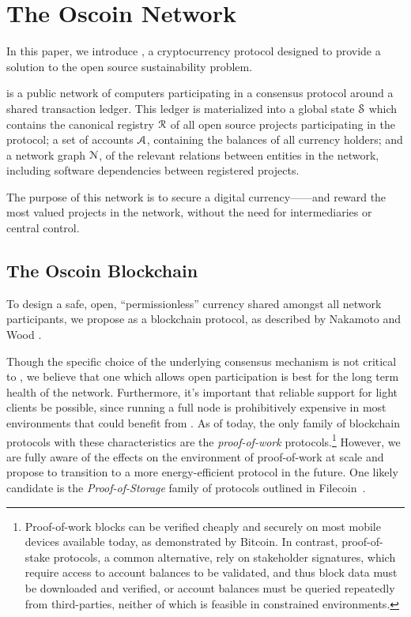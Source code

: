 \section{The Oscoin Network}
\label{s:oscoin}

\noindent In this paper, we introduce \oscoin{}, a cryptocurrency protocol
designed to provide a solution to the open source sustainability problem.

\Oscoin{} is a public network of computers participating in a consensus
protocol around a shared transaction ledger.
This ledger is materialized into a global state $\mathcal{S}$ which
contains the canonical registry $\mathcal{R}$ of all open source
projects participating in the protocol; a set of accounts
$\mathcal{A}$, containing the balances of all currency holders; and
a network graph $\mathcal{N}$, of the relevant relations between
entities in the network, including software dependencies between registered projects.

The purpose of this network is to secure a digital currency---\oscoin{}---and
reward the most valued projects in the network, without the need
for intermediaries or central control.

\subsection{The Oscoin Blockchain}

To design a safe, open, ``permissionless'' currency shared amongst all network
participants, we propose \oscoin{} as a blockchain protocol, as
described by Nakamoto \cite{bitcoin} and Wood \cite{ethereum}.

Though the specific choice of the underlying consensus mechanism is not
critical to \oscoin{}, we believe that one which allows open
participation is best for the long term health of the network. Furthermore,
it's important that reliable support for light clients be possible, since
running a full node is prohibitively expensive in most environments that could
benefit from \oscoin{}. As of today, the only family of blockchain protocols with these
characteristics are the \emph{proof-of-work} protocols.\footnote{Proof-of-work blocks
can be verified cheaply and securely on most mobile devices available
today, as demonstrated by Bitcoin. In contrast, proof-of-stake protocols,
a common alternative, rely on stakeholder signatures, which require access to
account balances to be validated, and thus block data must be downloaded and
verified, or account balances must be queried repeatedly from third-parties,
neither of which is feasible in constrained environments.} However, we are
fully aware of the effects on the environment of proof-of-work at
scale and propose to transition to a more energy-efficient protocol in the future.
One likely candidate is the \emph{Proof-of-Storage} family of protocols outlined
in Filecoin~\cite{filecoin}.

